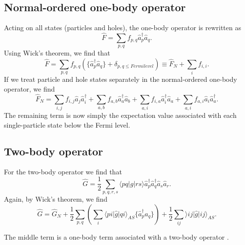 \subsection{Normal-ordered one-body operator}

Acting on all states (particles and holes), the one-body operator is rewritten as
\begin{equation}
\hat{F} = \sum_{p,q} f_{p,q}  \hat{a}_p^{\dagger} \hat{a}_q.
\label{eqn:onebody_n}
\end{equation}
Using Wick's theorem, we find that
\begin{equation}
\hat{F} = \sum_{p,q} f_{p,q}  (\{\hat{a}_p^{\dagger} \hat{a}_q \} + \delta_{p,q \leq Fermi level}) \equiv \hat{F}_N + \sum_{i} f_{i,i} .
\label{eqn:onebody_n2}
\end{equation}
If we treat particle and hole states separately in the normal-ordered one-body operator, 
we find
\begin{equation}
\hat{F}_N = \sum_{i,j} f_{i,j}   \hat{a}_j \hat{a}_i^{\dagger} + \sum_{a,b} f_{a,b}  \hat{a}_a^{\dagger} \hat{a}_b + \sum_{a,i} f_{i,a}  \hat{a}_i^{\dagger} \hat{a}_a + \sum_{a,i} f_{a,i}   \hat{a}_i \hat{a}_a^{\dagger}.
\label{eqn:onebody_N}
\end{equation}
The remaining term is now simply the expectation value associated with each single-particle state below the Fermi level.

\subsection{Two-body operator}

For the two-body operator we find that
\begin{equation}
\hat{G} = \frac{1}{2} \sum_{p,q,r,s} \langle pq \vert g \vert rs \rangle  \hat{a}_{p}^{\dagger}\hat{a}_{q}^{\dagger} \hat{a}_{s} \hat{a}_r.
\label{eqn:twobody_n}
\end{equation}
Again, by Wick's theorem, we find \cite[p.82]{ShavittBartlett2009}
\begin{equation}
\hat{G} = \hat{G}_N + \frac{1}{2} \sum_{p,q} (\sum_i \langle pi \vert \hat{g} \vert qi \rangle_{AS} \{ \hat{a}_p^{\dagger} \hat{a}_q \}) + \frac{1}{2} \sum_{ij} \rangle ij \vert \hat{g} \vert ij \rangle_{AS}.
\label{eqn:twobody_N}
\end{equation}

The middle term is a one-body term associated with a two-body operator \cite{ShavittBartlett2009}.


